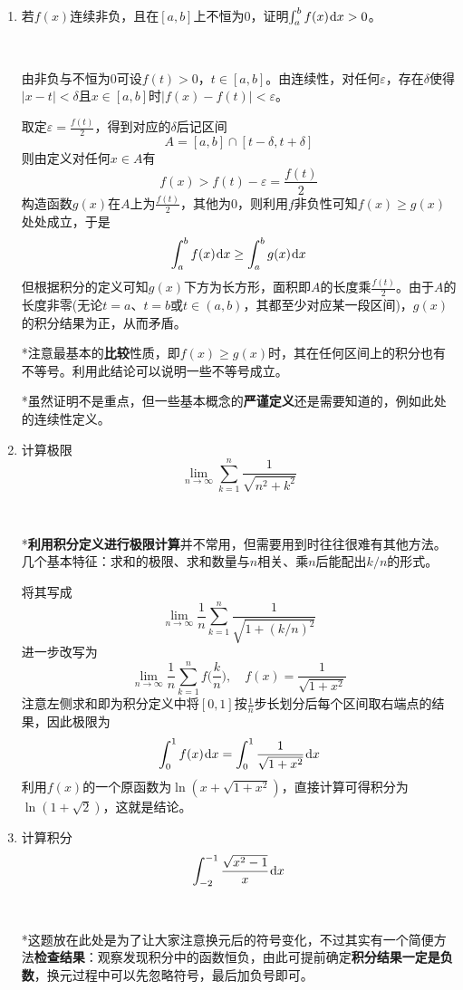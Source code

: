 \documentclass[a4paper,UTF8,fontset=windows]{ctexart}
\newcommand*{\dr}{\hspace{0.07em}\mathrm{d}}
\begin{document}
\begin{enumerate}
    \item 若$f(x)$连续非负，且在$[a,b]$上不恒为0，证明$\int_a^bf(x)\dr x>0$。
    
    \

    由非负与不恒为0可设$f(t)>0$，$t\in[a,b]$。由连续性，对任何$\varepsilon$，存在$\delta$使得$|x-t|<\delta$且$x\in[a,b]$时$|f(x)-f(t)|<\varepsilon$。

    取定$\varepsilon=\frac{f(t)}{2}$，得到对应的$\delta$后记区间
    $$A=[a,b]\cap[t-\delta,t+\delta]$$
    则由定义对任何$x\in A$有
    $$f(x)>f(t)-\varepsilon=\frac{f(t)}{2}$$
    构造函数$g(x)$在$A$上为$\frac{f(t)}{2}$，其他为0，则利用$f$非负性可知$f(x)\ge g(x)$处处成立，于是
    $$\int_a^bf(x)\dr x\ge\int_a^bg(x)\dr x$$
    但根据积分的定义可知$g(x)$下方为长方形，面积即$A$的长度乘$\frac{f(t)}{2}$。由于$A$的长度非零(无论$t=a$、$t=b$或$t\in(a,b)$，其都至少对应某一段区间)，$g(x)$的积分结果为正，从而矛盾。

    *注意最基本的\textbf{比较}性质，即$f(x)\ge g(x)$时，其在任何区间上的积分也有不等号。利用此结论可以说明一些不等号成立。

    *虽然证明不是重点，但一些基本概念的\textbf{严谨定义}还是需要知道的，例如此处的连续性定义。

    \item 计算极限
    $$\lim_{n\to\infty}\sum_{k=1}^n\frac{1}{\sqrt{n^2+k^2}}$$

    \
    
    *\textbf{利用积分定义进行极限计算}并不常用，但需要用到时往往很难有其他方法。几个基本特征：求和的极限、求和数量与$n$相关、乘$n$后能配出$k/n$的形式。

    将其写成
    $$\lim_{n\to\infty}\frac{1}{n}\sum_{k=1}^n\frac{1}{\sqrt{1+(k/n)^2}}$$
    进一步改写为
    $$\lim_{n\to\infty}\frac{1}{n}\sum_{k=1}^nf\bigg(\frac{k}{n}\bigg),\quad f(x)=\frac{1}{\sqrt{1+x^2}}$$
    注意左侧求和即为积分定义中将$[0,1]$按$\frac{1}{n}$步长划分后每个区间取右端点的结果，因此极限为
    $$\int_0^1f(x)\dr x=\int_0^1\frac{1}{\sqrt{1+x^2}}\dr x$$
    利用$f(x)$的一个原函数为$\ln(x+\sqrt{1+x^2})$，直接计算可得积分为$\ln(1+\sqrt2)$，这就是结论。


    \item 计算积分
    $$\int_{-2}^{-1}\frac{\sqrt{x^2-1}}{x}\dr x$$

    \

    *这题放在此处是为了让大家注意换元后的符号变化，不过其实有一个简便方法\textbf{检查结果}：观察发现积分中的函数恒负，由此可提前确定\textbf{积分结果一定是负数}，换元过程中可以先忽略符号，最后加负号即可。
    

\end{enumerate}
\end{document}
